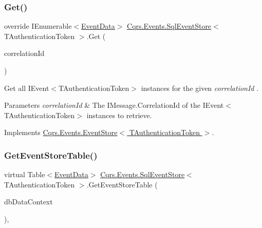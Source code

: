 \subsubsection{\texorpdfstring{Get()}{Get()}\hspace{0.1cm}{\footnotesize\ttfamily [2/2]}}
{\footnotesize\ttfamily override I\+Enumerable$<$\hyperlink{classCqrs_1_1Events_1_1EventData}{Event\+Data}$>$ \hyperlink{classCqrs_1_1Events_1_1SqlEventStore}{Cqrs.\+Events.\+Sql\+Event\+Store}$<$ T\+Authentication\+Token $>$.Get (\begin{DoxyParamCaption}\item[{Guid}]{correlation\+Id }\end{DoxyParamCaption})\hspace{0.3cm}{\ttfamily [virtual]}}



Get all I\+Event$<$\+T\+Authentication\+Token$>$ instances for the given {\itshape correlation\+Id} . 


\begin{DoxyParams}{Parameters}
{\em correlation\+Id} & The I\+Message.\+Correlation\+Id of the I\+Event$<$\+T\+Authentication\+Token$>$ instances to retrieve.\\
\hline
\end{DoxyParams}


Implements \hyperlink{classCqrs_1_1Events_1_1EventStore_a0096646f5dff730b0041b9469719c420_a0096646f5dff730b0041b9469719c420}{Cqrs.\+Events.\+Event\+Store$<$ T\+Authentication\+Token $>$}.

\mbox{\label{classCqrs_1_1Events_1_1SqlEventStore_a6daa6c32874ab593d0d8a54c90d219c6_a6daa6c32874ab593d0d8a54c90d219c6}} 
\subsubsection{\texorpdfstring{Get\+Event\+Store\+Table()}{GetEventStoreTable()}}
{\footnotesize\ttfamily virtual Table$<$\hyperlink{classCqrs_1_1Events_1_1EventData}{Event\+Data}$>$ \hyperlink{classCqrs_1_1Events_1_1SqlEventStore}{Cqrs.\+Events.\+Sql\+Event\+Store}$<$ T\+Authentication\+Token $>$.Get\+Event\+Store\+Table (\begin{DoxyParamCaption}\item[{Data\+Context}]{db\+Data\+Context }\end{DoxyParamCaption})\hspace{0.3cm}{\ttfamily [protected]}, {\ttfamily [virtual]}}

